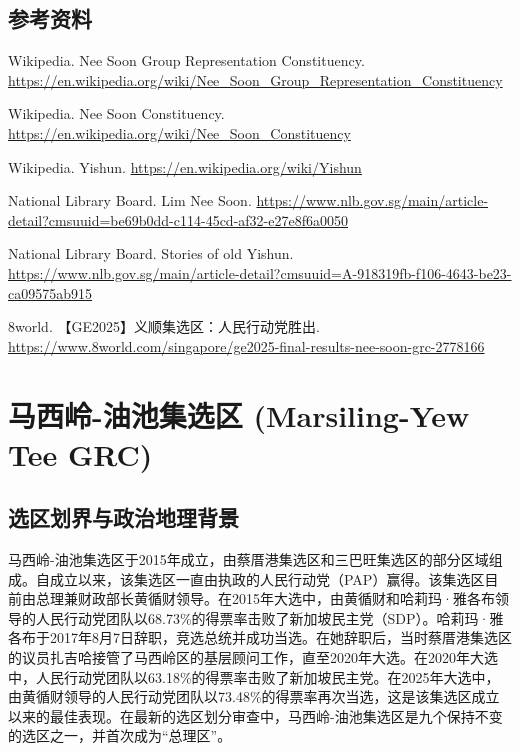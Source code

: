 \documentclass[11pt,a4paper,twoside,openany]{book}
\begin{document}
\section*{参考资料}
\begin{enumerate}[label={[\arabic*]},leftmargin=*,topsep=2pt,itemsep=1pt,parsep=0pt]
  \item Wikipedia. Nee Soon Group Representation Constituency. \url{https://en.wikipedia.org/wiki/Nee_Soon_Group_Representation_Constituency}
  \item Wikipedia. Nee Soon Constituency. \url{https://en.wikipedia.org/wiki/Nee_Soon_Constituency}
  \item Wikipedia. Yishun. \url{https://en.wikipedia.org/wiki/Yishun}
  \item National Library Board. Lim Nee Soon. \url{https://www.nlb.gov.sg/main/article-detail?cmsuuid=be69b0dd-c114-45cd-af32-e27e8f6a0050}
  \item National Library Board. Stories of old Yishun. \url{https://www.nlb.gov.sg/main/article-detail?cmsuuid=A-918319fb-f106-4643-be23-ca09575ab915}
  \item 8world. 【GE2025】义顺集选区：人民行动党胜出. \url{https://www.8world.com/singapore/ge2025-final-results-nee-soon-grc-2778166}
\end{enumerate}

\chapter{马西岭-油池集选区 (Marsiling-Yew Tee GRC)}

\section{选区划界与政治地理背景}
马西岭-油池集选区于2015年成立，由蔡厝港集选区和三巴旺集选区的部分区域组成。自成立以来，该集选区一直由执政的人民行动党（PAP）赢得。该集选区目前由总理兼财政部长黄循财领导。在2015年大选中，由黄循财和哈莉玛·雅各布领导的人民行动党团队以68.73\%的得票率击败了新加坡民主党（SDP）。哈莉玛·雅各布于2017年8月7日辞职，竞选总统并成功当选。在她辞职后，当时蔡厝港集选区的议员扎吉哈接管了马西岭区的基层顾问工作，直至2020年大选。在2020年大选中，人民行动党团队以63.18\%的得票率击败了新加坡民主党。在2025年大选中，由黄循财领导的人民行动党团队以73.48\%的得票率再次当选，这是该集选区成立以来的最佳表现。在最新的选区划分审查中，马西岭-油池集选区是九个保持不变的选区之一，并首次成为“总理区”。
\end{document}
